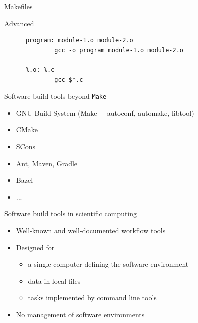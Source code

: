 \documentclass[aspectratio=169]{beamer}
\begin{document}
\begin{frame}[fragile]{Makefiles}

  \begin{block}{Advanced}
    \begin{lstlisting}
      program: module-1.o module-2.o
              gcc -o program module-1.o module-2.o

      %.o: %.c
              gcc $*.c
    \end{lstlisting}
  \end{block}

\end{frame}

\begin{frame}{Software build tools beyond \texttt{Make}}

  \begin{itemize}
  \item GNU Build System (Make + autoconf, automake, libtool)
  \item CMake
  \item SCons
  \item Ant, Maven, Gradle
  \item Bazel
  \item ...
  \end{itemize}

\end{frame}

\begin{frame}{Software build tools in scientific computing}

  \begin{itemize}
  \item Well-known and well-documented workflow tools
  \item Designed for
    \begin{itemize}
    \item a single computer defining the software environment
    \item data in local files
    \item tasks implemented by command line tools
    \end{itemize}
  \item No management of software environments
  \end{itemize}

\end{frame}
\end{document}
